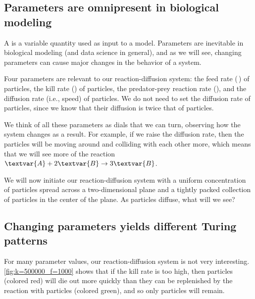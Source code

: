 \FloatBarrier
{}
\subsection{Parameters are omnipresent in biological modeling}

A  is a variable quantity used as input to a model. Parameters are inevitable in biological modeling (and data science in general), and as we will see, changing parameters can cause major changes in the behavior of a system.

Four parameters are relevant to our reaction-diffusion system: the feed rate (\,) of  particles, the kill rate () of  particles, the predator-prey reaction rate (), and the diffusion rate (i.e., speed) of  particles. We do not need to set the diffusion rate of  particles, since we know that their diffusion is twice that of  particles.

\begin{qbox}\end{qbox}

We think of all these parameters as dials that we can turn, observing how the system changes as a result. For example, if we raise the diffusion rate, then the particles will be moving around and colliding with each other more, which means that we will see more of the reaction $\textvar{A} + 2\textvar{B} \rightarrow 3\textvar{B}$.

We will now initiate our reaction-diffusion system with a uniform concentration of  particles spread across a two-dimensional plane and a tightly packed collection of  particles in the center of the plane. As  particles diffuse, what will we see?\\

\FloatBarrier
{}
\subsection{Changing parameters yields different Turing patterns}

For many parameter values, our reaction-diffusion system is not very interesting. \autoref{fig:k=500000_f=1000} shows that if the kill rate is too high, then  particles (colored red) will die out more quickly than they can be replenished by the reaction with  particles (colored green), and so only  particles will remain.


